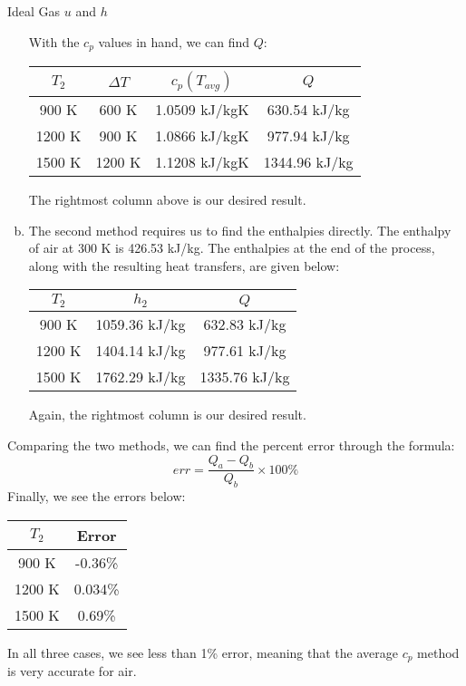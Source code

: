 \begin{example}{Ideal Gas $u$ and $h$}
\begin{enumerate}[a)]
    With the $c_p$ values in hand, we can find $Q$:
    \begin{center}
      \begin{tabular}{cccc}
        $T_2$ & $\Delta T$ & $c_p(T_{avg})$ & $Q$\\ \hline
        900 K & 600 K & 1.0509 kJ/kgK & 630.54 kJ/kg\\
        1200 K & 900 K & 1.0866 kJ/kgK & 977.94 kJ/kg\\
        1500 K & 1200 K & 1.1208 kJ/kgK & 1344.96 kJ/kg
      \end{tabular}
    \end{center}
    The rightmost column above is our desired result.
  \item The second method requires us to find the enthalpies directly.  The enthalpy of air at 300 K is 426.53 kJ/kg.  The enthalpies at the end of the process, along with the resulting heat transfers, are given below:
    \begin{center}
      \begin{tabular}{ccc}
        $T_2$ & $h_2$ & $Q$ \\ \hline
        900 K & 1059.36 kJ/kg & 632.83 kJ/kg \\
        1200 K & 1404.14 kJ/kg & 977.61 kJ/kg \\
        1500 K & 1762.29 kJ/kg & 1335.76 kJ/kg
      \end{tabular}
    \end{center}
    Again, the rightmost column is our desired result.
  \end{enumerate}
  Comparing the two methods, we can find the percent error through the formula:
  \begin{equation*}
    err = \frac{Q_a-Q_b}{Q_b} \times 100 \%
  \end{equation*}
  Finally, we see the errors below:
  \begin{center}
      \begin{tabular}{cc}
        $T_2$ & Error \\ \hline
        900 K & -0.36\%\\
        1200 K & 0.034\% \\
        1500 K & 0.69\%
      \end{tabular}
  \end{center}
  In all three cases, we see less than 1\% error, meaning that the average $c_p$ method is very accurate for air.
\end{example}
\newpage
